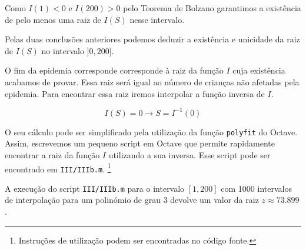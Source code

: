 \documentclass[portuguese, a4paper]{article}
\newcommand\tu[0]{\textunderscore}
\begin{document}
		\par
		Como $I(1) < 0$ e $I(200) > 0$ pelo Teorema de Bolzano garantimos a
		existência de pelo menos uma raiz de $I(S)$ nesse intervalo.

		\par
		Pelas duas conclusões anteriores podemos deduzir a existência e
		unicidade da raiz de $I(S)$ no intervalo $]0, 200]$.

		\par \null \par
		O fim da epidemia corresponde corresponde à raiz da função $I$ cuja
		existência acabamos de provar. Essa raiz será igual ao número de
		crianças não afetadas pela epidemia. Para encontrar essa raiz iremos
		interpolar a função inversa de $I$.

		\begin{equation}
			I(S) = 0 \rightarrow S = I^{-1}(0)
		\end{equation}

		\par
		O seu cálculo pode ser simplificado pela utilização da função
		\texttt{polyfit} do Octave.  Assim, escrevemos um pequeno script em
		Octave que permite rapidamente encontrar a raiz da função $I$
		utilizando a sua inversa. Esse script pode ser encontrado em
		\texttt{III/III\tu b.m}. \footnote{Instruções de utilização podem ser
		encontradas no código fonte.}

		\par
		A execução do script \texttt{III/III\tu b.m} para o intervalo $[1, 200]$
		com 1000 intervalos de interpolação para um polinómio de grau 3 devolve
		um valor da raiz $z \approx 73.899$.



\end{document}
